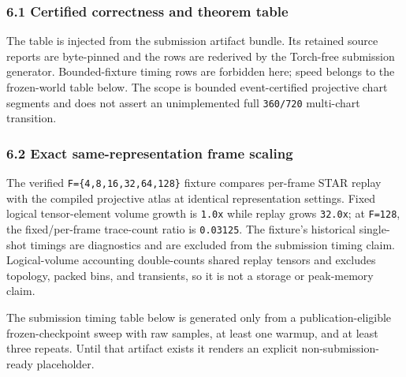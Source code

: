 \documentclass[
]{article}
\begin{document}
\subsubsection{6.1 Certified correctness and theorem
table}\label{certified-correctness-and-theorem-table}

The table is injected from the submission artifact bundle. Its retained
source reports are byte-pinned and the rows are rederived by the
Torch-free submission generator. Bounded-fixture timing rows are
forbidden here; speed belongs to the frozen-world table below. The scope
is bounded event-certified projective chart segments and does not assert
an unimplemented full \texttt{360/720} multi-chart transition.

\begin{table}[t]
\centering
\caption{Certified bounded correctness and structural trace reuse.}
\label{tab:certified-correctness}

\end{table}

\subsubsection{6.2 Exact same-representation frame
scaling}\label{exact-same-representation-frame-scaling}

The verified \texttt{F=\{4,8,16,32,64,128\}} fixture compares per-frame
STAR replay with the compiled projective atlas at identical
representation settings. Fixed logical tensor-element volume growth is
\texttt{1.0x} while replay grows \texttt{32.0x}; at \texttt{F=128}, the
fixed/per-frame trace-count ratio is \texttt{0.03125}. The fixture's
historical single-shot timings are diagnostics and are excluded from the
submission timing claim. Logical-volume accounting double-counts shared
replay tensors and excludes topology, packed bins, and transients, so it
is not a storage or peak-memory claim.

The submission timing table below is generated only from a
publication-eligible frozen-checkpoint sweep with raw samples, at least
one warmup, and at least three repeats. Until that artifact exists it
renders an explicit non-submission-ready placeholder.

\begin{table}[t]
\centering
\caption{Frozen identical-world replay versus compiled-atlas scaling.}
\label{tab:frozen-world-scaling}

\end{table}
\end{document}
